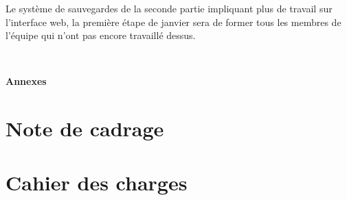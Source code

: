 Le système de sauvegardes de la seconde partie impliquant plus de travail sur l'interface web, la première étape de janvier sera de former tous les membres de l'équipe qui n'ont pas encore travaillé dessus.

\newpage
~\vspace{5cm}
\begin{center}
	{\Huge \textbf{Annexes}}
\end{center}
\newpage

\appendix

\section{Note de cadrage}
\label{note-cadrage}


\section{Cahier des charges}
\label{cahier-charges}


